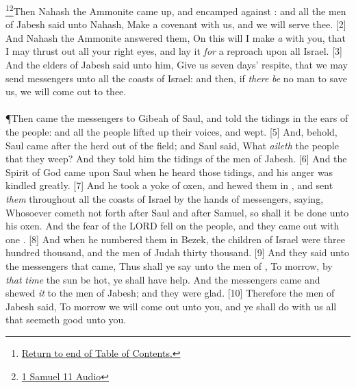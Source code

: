 \footnote{\textcolor[cmyk]{0.99998,1,0,0}{\hyperlink{TOC}{Return to end of Table of Contents.}}}\footnote{\href{https://audiobible.com/bible/1_samuel_11.html}{\textcolor[cmyk]{0.99998,1,0,0}{1 Samuel 11 Audio}}}\textcolor[cmyk]{0.99998,1,0,0}{Then Nahash the Ammonite came up, and encamped against : and all the men of Jabesh said unto Nahash, Make a covenant with us, and we will serve thee.}
[2] \textcolor[cmyk]{0.99998,1,0,0}{And Nahash the Ammonite answered them, On this  will I make \emph{a}  with you, that I may thrust out all your right eyes, and lay it \emph{for} a reproach upon all Israel.}
[3] \textcolor[cmyk]{0.99998,1,0,0}{And the elders of Jabesh said unto him, Give us seven days' respite, that we may send messengers unto all the coasts of Israel: and then, if \emph{there} \emph{be} no man to save us, we will come out to thee.}\\
\\
\P \textcolor[cmyk]{0.99998,1,0,0}{Then came the messengers to Gibeah of Saul, and told the tidings in the ears of the people: and all the people lifted up their voices, and wept.}
[5] \textcolor[cmyk]{0.99998,1,0,0}{And, behold, Saul came after the herd out of the field; and Saul said, What \emph{aileth} the people that they weep? And they told him the tidings of the men of Jabesh.}
[6] \textcolor[cmyk]{0.99998,1,0,0}{And the Spirit of God came upon Saul when he heard those tidings, and his anger was kindled greatly.}
[7] \textcolor[cmyk]{0.99998,1,0,0}{And he took a yoke of oxen, and hewed them in , and sent \emph{them} throughout all the coasts of Israel by the hands of messengers, saying, Whosoever cometh not forth after Saul and after Samuel, so shall it be done unto his oxen. And the fear of the LORD fell on the people, and they came out with one .}
[8] \textcolor[cmyk]{0.99998,1,0,0}{And when he numbered them in Bezek, the children of Israel were three hundred thousand, and the men of Judah thirty thousand.}
[9] \textcolor[cmyk]{0.99998,1,0,0}{And they said unto the messengers that came, Thus shall ye say unto the men of , To morrow, by \emph{that} \emph{time} the sun be hot, ye shall have help. And the messengers came and shewed \emph{it} to the men of Jabesh; and they were glad.}
[10] \textcolor[cmyk]{0.99998,1,0,0}{Therefore the men of Jabesh said, To morrow we will come out unto you, and ye shall do with us all that seemeth good unto you.}
